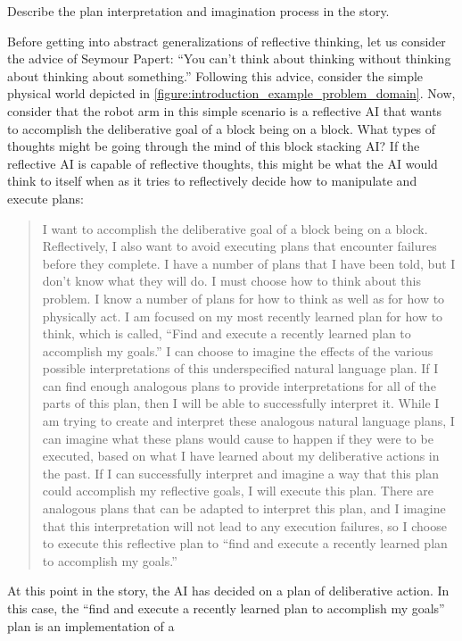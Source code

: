 Describe the plan interpretation and imagination process in the story.

Before getting into abstract generalizations of reflective thinking,
let us consider the advice of Seymour Papert: ``You can't think about
thinking without thinking about thinking about something.''  Following
this advice, consider the simple physical world depicted in
{\autoref{figure:introduction_example_problem_domain}}.  Now, consider
that the robot arm in this simple scenario is a reflective AI that
wants to accomplish the deliberative goal of a block being on a block.
What types of thoughts might be going through the mind of this block
stacking AI?  If the reflective AI is capable of reflective thoughts,
this might be what the AI would think to itself when as it tries to
reflectively decide how to manipulate and execute plans:
\begin{quote}
  I want to accomplish the deliberative goal of a block being on a
  block.  Reflectively, I also want to avoid executing plans that
  encounter failures before they complete.  I have a number of plans
  that I have been told, but I don't know what they will do.  I must
  choose how to think about this problem.  I know a number of plans
  for how to think as well as for how to physically act.  I am focused
  on my most recently learned plan for how to think, which is called,
  ``Find and execute a recently learned plan to accomplish my goals.''
  I can choose to imagine the effects of the various possible
  interpretations of this underspecified natural language plan.  If I
  can find enough analogous plans to provide interpretations for all
  of the parts of this plan, then I will be able to successfully
  interpret it.  While I am trying to create and interpret these
  analogous natural language plans, I can imagine what these plans
  would cause to happen if they were to be executed, based on what I
  have learned about my deliberative actions in the past.  If I can
  successfully interpret and imagine a way that this plan could
  accomplish my reflective goals, I will execute this plan.  There are
  analogous plans that can be adapted to interpret this plan, and I
  imagine that this interpretation will not lead to any execution
  failures, so I choose to execute this reflective plan to ``find and
  execute a recently learned plan to accomplish my goals.''
\end{quote}
At this point in the story, the AI has decided on a plan of
deliberative action.  In this case, the ``find and execute a recently
learned plan to accomplish my goals'' plan is an implementation of a
